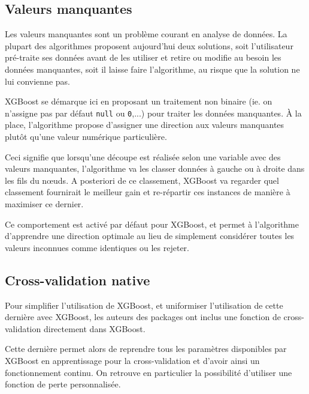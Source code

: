 \subsection{Valeurs manquantes}
Les valeurs manquantes sont un problème courant en analyse de données. La plupart des algorithmes proposent aujourd'hui deux solutions, soit l'utilisateur pré-traite ses données avant de les utiliser et retire ou modifie au besoin les données manquantes, soit il \og laisse faire\fg{} l'algorithme, au risque que la solution ne lui convienne pas.

XGBoost se démarque ici en proposant un traitement non binaire (ie. on n'assigne pas par défaut \texttt{null} ou \texttt{0},...) pour traiter les données manquantes. À la place, l'algorithme propose d'assigner une direction aux valeurs manquantes plutôt qu'une valeur numérique particulière.

Ceci signifie que lorsqu'une découpe est réalisée selon une variable avec des valeurs manquantes, l'algorithme va les classer données \og à gauche ou à droite\fg{} dans les fils du n\oe uds. A posteriori de ce classement, XGBoost va regarder quel classement fournirait le meilleur gain et re-répartir ces instances de manière à maximiser ce dernier.

Ce comportement est activé par défaut pour XGBoost, et permet à l'algorithme d'apprendre une direction optimale au lieu de simplement considérer toutes les valeurs inconnues comme identiques ou les rejeter.
\subsection{Cross-validation native}
Pour simplifier l'utilisation de XGBoost, et uniformiser l'utilisation de cette dernière avec XGBoost, les auteurs des packages ont inclus une fonction de cross-validation directement dans XGBoost.

Cette dernière permet alors de reprendre tous les paramètres disponibles par XGBoost en apprentissage pour la cross-validation et d'avoir ainsi un fonctionnement continu. On retrouve en particulier la possibilité d'utiliser une fonction de perte personnalisée.
